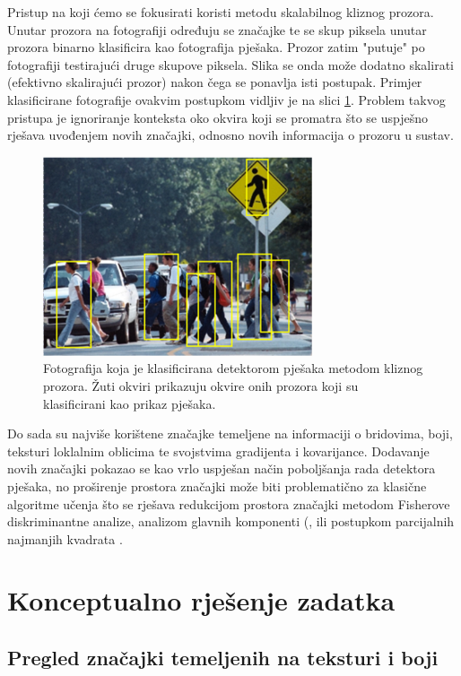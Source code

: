 \documentclass[seminar]{fer}
\begin{document}
Pristup na koji ćemo se fokusirati koristi metodu skalabilnog kliznog prozora. Unutar prozora na fotografiji određuju se značajke te se skup piksela unutar prozora binarno klasificira kao fotografija pješaka. Prozor zatim "putuje" po fotografiji testirajući druge skupove piksela. Slika se onda može dodatno skalirati (efektivno skalirajući prozor) nakon čega se ponavlja isti postupak. Primjer klasificirane fotografije ovakvim postupkom vidljiv je na slici \ref{primjer_klasifikacije}. Problem takvog pristupa je ignoriranje konteksta oko okvira koji se promatra što se uspješno rješava uvođenjem novih značajki, odnosno novih informacija o prozoru u sustav.

\begin{figure}
\center
\includegraphics[scale=0.7]{img/crossing.png}
\caption{Fotografija koja je klasificirana detektorom pješaka metodom kliznog prozora. Žuti okviri prikazuju okvire onih prozora koji su klasificirani kao prikaz pješaka.}
\label{primjer_klasifikacije}
\end{figure}

Do sada su najviše korištene značajke temeljene na informaciji o bridovima, boji, teksturi loklalnim oblicima te svojstvima gradijenta i kovarijance. Dodavanje novih značajki pokazao se kao vrlo uspješan način poboljšanja rada detektora pješaka, no proširenje prostora značajki može biti problematično za klasične algoritme učenja što se rješava redukcijom prostora značajki metodom Fisherove diskriminantne analize,  analizom glavnih komponenti (, ili postupkom parcijalnih najmanjih kvadrata  \cite{Schwartz}. 

\section{Konceptualno rješenje zadatka}
\subsection{Pregled značajki temeljenih na teksturi i boji}
\end{document}
